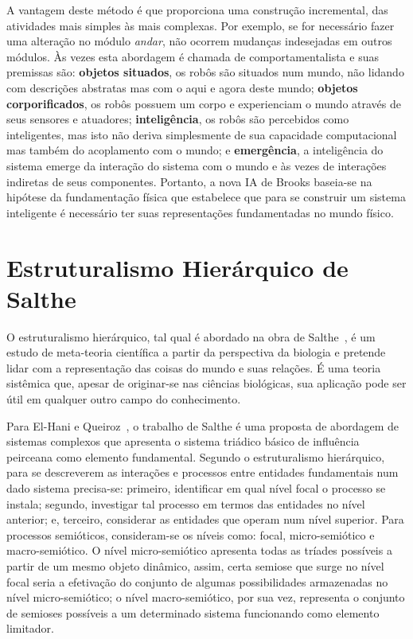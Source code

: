 A vantagem deste método é que proporciona uma construção incremental, das atividades mais simples às mais complexas. Por exemplo, se for necessário fazer uma alteração no módulo \textit{andar}, não ocorrem mudanças indesejadas em outros módulos. Às vezes esta abordagem é chamada de comportamentalista e suas premissas são: \textbf{objetos situados}, os robôs são situados num mundo, não lidando com descrições abstratas mas com o aqui e agora deste mundo; \textbf{objetos corporificados}, os robôs possuem um corpo e experienciam o mundo através de seus sensores e atuadores; \textbf{inteligência}, os robôs são percebidos como inteligentes, mas isto não deriva simplesmente de sua capacidade computacional mas também do acoplamento com o mundo; e \textbf{emergência}, a inteligência do sistema emerge da interação do sistema com o mundo e às vezes de interações indiretas de seus componentes. Portanto, a nova IA de Brooks baseia-se na hipótese da fundamentação física que estabelece que para se construir um sistema inteligente é necessário ter suas representações  fundamentadas no mundo físico.

\section{Estruturalismo Hierárquico de Salthe}

O estruturalismo hierárquico, tal qual é abordado na obra de Salthe~\cite{salthe85}, é um estudo de meta-teoria científica a partir da perspectiva da biologia e pretende lidar com a representação das coisas do mundo e suas relações. É uma teoria sistêmica que, apesar de originar-se nas ciências biológicas, sua aplicação pode ser útil em qualquer outro campo do conhecimento.

Para El-Hani e Queiroz~\cite{queiroz07}, o trabalho de Salthe é uma proposta de abordagem de sistemas complexos que apresenta o sistema triádico básico de influência peirceana como elemento fundamental. Segundo o estruturalismo hierárquico, para se descreverem as interações e processos entre entidades fundamentais num dado sistema precisa-se: primeiro, identificar em  qual nível focal o processo se instala; segundo, investigar tal processo em termos das entidades no nível anterior; e, terceiro, considerar as entidades que operam num nível superior. Para processos semióticos, consideram-se os níveis como: focal, micro-semiótico e macro-semiótico. O nível micro-semiótico apresenta todas as tríades possíveis a partir de um mesmo objeto dinâmico, assim, certa semiose que surge no nível focal seria a efetivação do conjunto de algumas possibilidades armazenadas no nível micro-semiótico; o nível macro-semiótico, por sua vez, representa o conjunto de semioses possíveis a um determinado sistema funcionando como elemento limitador.

